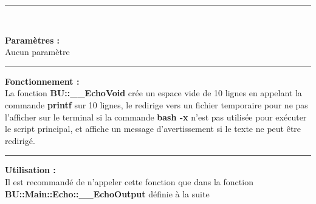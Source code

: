 \documentclass[a4paper,10pt]{article}
\begin{document}
\par\noindent\rule{\textwidth}{0.4pt}\\

\begin{justify}
    \textbf{Paramètres :}\\[1\baselineskip]
    Aucun paramètre
\end{justify}

\par\noindent\rule{\textwidth}{0.4pt}

\begin{justify}
    \textbf{Fonctionnement :}\\[1\baselineskip]
    La fonction \textbf{\color{mauve}BU::\_\_EchoVoid} crée un espace vide de 10 lignes en appelant la commande \textbf{\color{gray}printf} sur 10 lignes, le redirige vers un fichier temporaire pour ne pas l'afficher sur le terminal si la commande \textbf{\color{gray}bash -x} n'est pas utilisée pour exécuter le script principal, et affiche un message d'avertissement si le texte ne peut être redirigé.
\end{justify}

\par\noindent\rule{\textwidth}{0.4pt}

\begin{justify}
    \textbf{Utilisation :}\\[1\baselineskip]
    Il est recommandé de n'appeler cette fonction que dans la fonction \textbf{\color{mauve}BU::Main::Echo::\_\_EchoOutput} définie à la suite
\end{justify}
\end{document}

